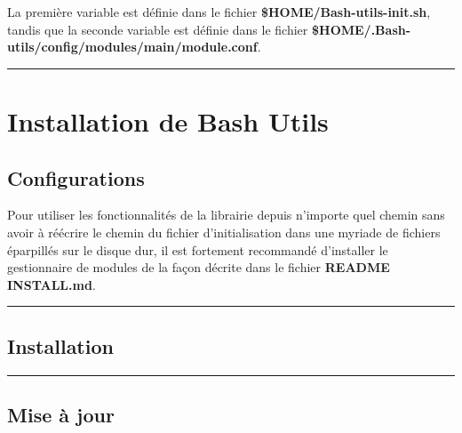 \documentclass[a4paper,10pt]{article}
\begin{document}
\begin{justify}
    La première variable est définie dans le fichier \textbf{\color{vars}\$HOME\color{path}/Bash-utils-init.sh}, tandis que la seconde variable est définie dans le fichier \textbf{\color{vars}\$HOME\color{path}/.Bash-utils/config/modules/main/module.conf}.
\end{justify}





\color{sec1}\par\noindent\rule{\textwidth}{0.4pt}\color{text}

\color{sec1}
\section{Installation de Bash Utils}\color{text}

\color{sec2}
\subsection{Configurations}\color{text}

\begin{justify}
    Pour utiliser les fonctionnalités de la librairie depuis n'importe quel chemin sans avoir à réécrire le chemin du fichier d'initialisation dans une myriade de fichiers éparpillés sur le disque dur, il est fortement recommandé d'installer le gestionnaire de modules de la façon décrite dans le fichier \textbf{\color{path}README INSTALL.md}.
\end{justify}




\color{sec2}\par\noindent\rule{\textwidth}{0.4pt}\color{text}

\color{sec2}
\subsection{Installation}\color{text}

\begin{justify}

\end{justify}




\color{sec2}\par\noindent\rule{\textwidth}{0.4pt}\color{text}

\color{sec2}
\subsection{Mise à jour}\color{text}

\begin{justify}

\end{justify}
\end{document}
